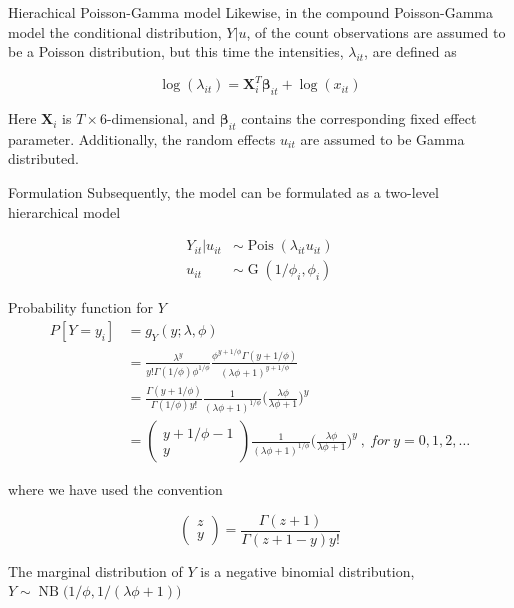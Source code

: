 \documentclass[aspectratio=169]{beamer}
\DeclareMathOperator{\G}{G}
\DeclareMathOperator{\NB}{NB}
\DeclareMathOperator{\Pois}{Pois}
\begin{document}
\begin{frame}{Hierachical Poisson-Gamma model}
Likewise, in the compound Poisson-Gamma model the conditional
distribution, \(Y|u\), of the count observations are assumed to be a
Poisson distribution, but this time the intensities, \(\lambda_{it}\),
are defined as

\begin{equation}
  \log(\lambda_{it})=\mathbf{X}_i^T\mathbf{\beta}_{it}+\log(x_{it})
\end{equation}

Here \(\mathbf{X}_i\) is \(T\times6\)-dimensional, and
\(\mathbf{\beta}_{it}\) contains the corresponding fixed effect
parameter. Additionally, the random effects \(u_{it}\) are assumed to be
Gamma distributed.
\end{frame}

\begin{frame}{Formulation}
\protect\hypertarget{formulation-1}{}
Subsequently, the model can be formulated as a two-level hierarchical
model

\begin{subequations} \label{eq:PoisGam}
  \begin{alignat}{2}
    Y_{it}|u_{it} &\sim \Pois (\lambda_{it}u_{it}) \label{eq:pois_g0} \\ 
    u_{it} &\sim \G(1/\phi_{i},\phi_{i}) \label{eq:pois_g1}
  \end{alignat}
\end{subequations}
\end{frame}

\begin{frame}{Probability function for \(Y\)}
\protect\hypertarget{probability-function-for-y}{}
\begin{equation} \label{eq:pdfMix}
  \begin{aligned}
    P[Y=y_i]&=g_{Y}(y;\lambda, \phi) \\
    &=\frac{\lambda^{y}}{y!\Gamma(1/\phi)\phi^{1/\phi}}\frac{\phi^{y+1/\phi}\Gamma(y+1/\phi)}{(\lambda \phi + 1)^{y+1/\phi}} \\
    &=\frac{\Gamma(y+1/\phi)}{\Gamma(1/\phi)y!}\frac{1}{(\lambda\phi+1)^{1/\phi}}\bigg(\frac{\lambda\phi}{\lambda\phi+1}\bigg)^{y} \\
    &=\begin{pmatrix} y+1/\phi-1 \\ y \end{pmatrix} \frac{1}{(\lambda\phi+1)^{1/\phi}}\bigg(\frac{\lambda\phi}{\lambda\phi+1}\bigg)^{y} \ , \ for \ y = 0, 1, 2, \dots
  \end{aligned}
\end{equation}

where we have used the convention

\begin{equation}
  \begin{pmatrix} z\\y \end{pmatrix} = \frac{\Gamma(z+1)}{\Gamma(z+1-y)y!}
\end{equation}

The marginal distribution of \(Y\) is a negative binomial distribution,
\(Y\sim \NB\big(1/\phi,1/(\lambda \phi+1)\big)\)
\end{frame}
\end{document}
